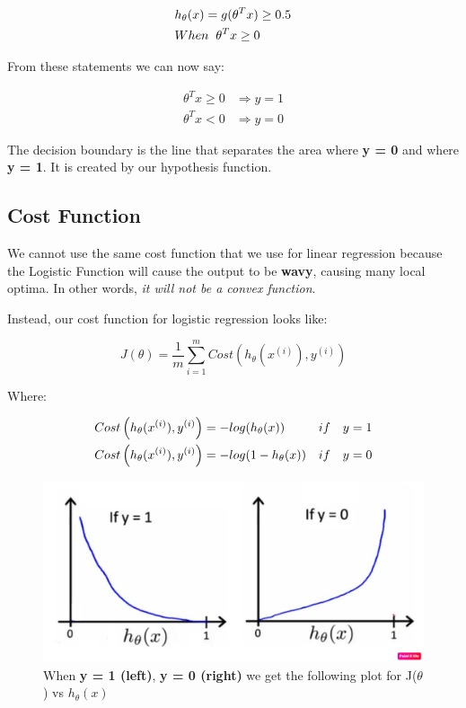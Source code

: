 \begin{align*}
&h_\theta(x)=g(\theta^Tx) \geq 0.5 \\
&When \hspace{0.2cm} \theta^Tx \geq 0
\end{align*}

From these statements we can now say:

\begin{align*}
\theta^Tx \geq 0 &\Rightarrow y=1\\
\theta^Tx < 0 &\Rightarrow y=0
\end{align*}

The decision boundary is the line that separates the area where \textbf{y = 0 }and where \textbf{y = 1}. It is created by our hypothesis function.

\subsection{Cost Function}

We cannot use the same cost function that we use for linear regression because the Logistic Function will cause the output to be \textbf{wavy}, causing many local optima. In other words, \textit{it will not be a convex function}.

Instead, our cost function for logistic regression looks like:

\begin{equation}
J(\theta)=\frac{1}{m}\sum_{i=1}^{m}Cost\left(h_\theta(x^{(i)}),  y^{(i)}\right)
\end{equation}

Where:

\begin{align}
Cost\left(h_\theta(x^{(i)}),  y^{(i)}\right) &= -log(h_\theta(x)) &if \hspace{0.35cm} y = 1\\
Cost\left(h_\theta(x^{(i)}),  y^{(i)}\right)& = -log(1-h_\theta(x)) & if \hspace{0.35cm} y = 0
\end{align}

\begin{figure}[h!]
	\centering
	\includegraphics[width=1\textwidth]{fig/cost_logistic}
	\caption{When \textbf{y = 1 (left)}, \textbf{y = 0 (right)} we get the following plot for J($ \theta $) vs $ h_\theta (x) $}
	\label{fig:logistic}
\end{figure}

